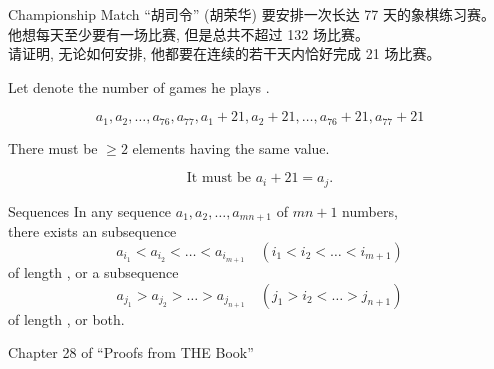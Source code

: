 \begin{frame}{}
  \begin{exampleblock}{Championship Match}
    ``胡司令'' (胡荣华) 要安排一次长达 77 天的象棋练习赛。\\[5pt]
    他想每天至少要有一场比赛, 但是总共不超过 132 场比赛。 \\[5pt]
    请证明, 无论如何安排, 他都要在连续的若干天内恰好完成 21 场比赛。
  \end{exampleblock}

  \pause
  \vspace{0.30cm}
  \begin{center}
    Let  denote the number of games
    he plays .
  \end{center}

  \pause
  \[
    a_{1}, a_{2}, \dots, a_{76}, a_{77},
    a_{1} + 21, a_{2} + 21, \dots, a_{76} + 21, a_{77} + 21
  \]
  \pause
  \begin{center}
    There must be $\ge 2$ elements having the same value.
  \end{center}
  \pause
  \[
    \text{It must be } a_{i} + 21 = a_{j}.
  \]
\end{frame}

\begin{frame}{}
  \begin{exampleblock}{Sequences}
    In any sequence $a_{1}, a_{2}, \dots, a_{mn+1}$ of $mn+1$  numbers, \\
    there exists an  subsequence
    \[
      a_{i_{1}} < a_{i_{2}} < \dots < a_{i_{m+1}} \quad (i_{1} < i_{2} < \dots < i_{m+1})
    \]
    of length , or a  subsequence
    \[
      a_{j_{1}} > a_{j_{2}} > \dots > a_{j_{n+1}} \quad (j_{1} > i_{2} < \dots > j_{n+1})
    \]
    of length , or both.
  \end{exampleblock}
\end{frame}

\begin{frame}{}

  \begin{center}
  \end{center}

  \begin{center}
    Chapter 28 of ``Proofs from THE Book''
  \end{center}
\end{frame}

